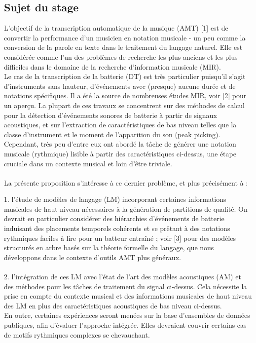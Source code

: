 \subsection*{Sujet du stage}
L'objectif de la transcription automatique de la musique (AMT) [1] est de convertir la performance d'un musicien en notation musicale - un peu comme la conversion de la parole en texte dans le traitement du langage naturel. Elle est considérée comme l'un des problèmes de recherche les plus anciens et les plus difficiles dans le domaine de la recherche d'information musicale (MIR).\\
Le cas de la transcription de la batterie (DT) est très particulier puisqu'il s'agit d'instruments sans hauteur, d'événements avec (presque) aucune durée et de notations spécifiques. Il a été la source de nombreuses études MIR, voir [2] pour un aperçu. La plupart de ces travaux se concentrent sur des méthodes de calcul pour la détection d'événements sonores de batterie à partir de signaux acoustiques, et sur l'extraction de caractéristiques de bas niveau telles que la classe d'instrument et le moment de l'apparition du son (peak picking). Cependant, très peu d'entre eux ont abordé la tâche de générer une notation musicale (rythmique) lisible à partir des caractéristiques ci-dessus, une étape cruciale dans un contexte musical et loin d'être triviale.\\\\
La présente proposition s'intéresse à ce dernier problème, et plus précisément à :

1. l'étude de modèles de langage (LM) incorporant certaines informations musicales de haut niveau nécessaires à la génération de partitions de qualité. On devrait en particulier considérer des hiérarchies d'événements de batterie induisant des placements temporels cohérents et se prêtant à des notations rythmiques faciles à lire pour un batteur entraîné ; voir [3] pour des modèles structurés en arbre basés sur la théorie formelle du langage, que nous développons dans le contexte d'outils AMT plus généraux.\\\\
2. l'intégration de ces LM avec l'état de l'art des modèles acoustiques (AM) et des méthodes pour les tâches de traitement du signal ci-dessus. Cela nécessite la prise en compte du contexte musical et des informations musicales de haut niveau des LM en plus des caractéristiques acoustiques de bas niveau ci-dessus.\\
En outre, certaines expériences seront menées sur la base d'ensembles de données publiques, afin d'évaluer l'approche intégrée. Elles devraient couvrir certains cas de motifs rythmiques complexes se chevauchant.\\

